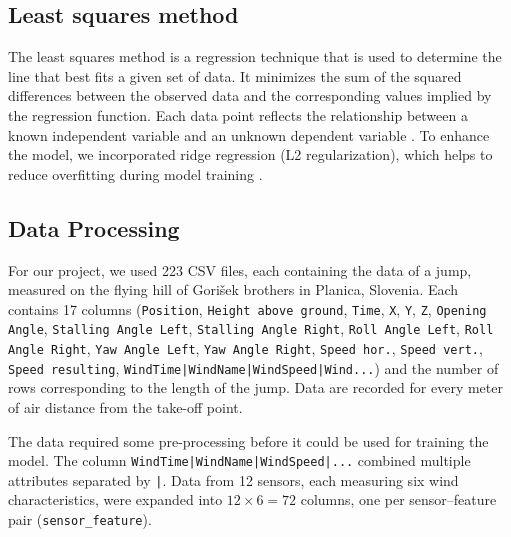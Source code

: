 \documentclass[sigconf]{acmart}
\begin{document}
\subsection{Least squares method}
The least squares method is a regression technique that is used to determine
the line that best fits a given set of data. It minimizes the sum of the
squared differences between the observed data and the corresponding values
implied by the regression function. Each data point reflects the relationship
between a known independent variable and an unknown dependent variable
\cite{plestenjak2016}. To enhance the model, we incorporated ridge regression
(L2 regularization), which helps to reduce overfitting during model training
\cite{vanwieringen2015}.

\subsection{Data Processing}
For our project, we used 223 CSV files, each containing the data of a jump,
measured on the flying hill of Gorišek brothers in Planica, Slovenia. Each
contains 17 columns (\texttt{Position}, \texttt{Height above ground},
\texttt{Time}, \texttt{X}, \texttt{Y}, \texttt{Z}, \texttt{Opening Angle},
\texttt{Stalling Angle Left}, \texttt{Stalling Angle Right},
\texttt{Roll Angle Left}, \texttt{Roll Angle Right}, \texttt{Yaw Angle Left},
\texttt{Yaw Angle Right}, \texttt{Speed hor.}, \texttt{Speed vert.},
\texttt{Speed resulting}, \texttt{WindTime|WindName|WindSpeed|Wind...}) and the
number of rows corresponding to the length of the jump. Data are recorded for
every meter of air distance from the take-off point.

The data required some pre-processing before it could be used for training the
model. The column \texttt{WindTime|WindName|WindSpeed|...} combined multiple
attributes separated by \texttt{|}. Data from 12 sensors, each measuring six
wind characteristics, were expanded into $12 \times 6 = 72$ columns, one per
sensor--feature pair (\texttt{sensor\_feature}).
\end{document}
